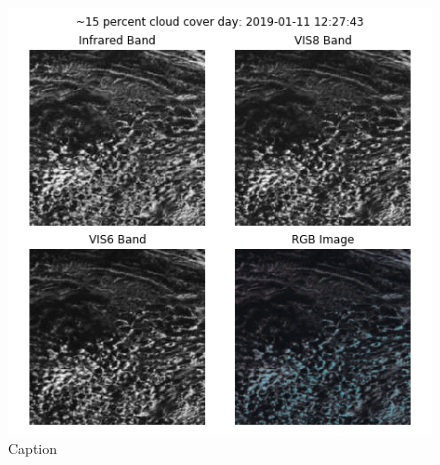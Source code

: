 \begin{figure}[h]
    \centering
    \includegraphics[totalheight=0.4\textheight]{15_per_day_sea_outlier.png}
    \caption{Caption}
    \label{fig:my_label}
\end{figure}


